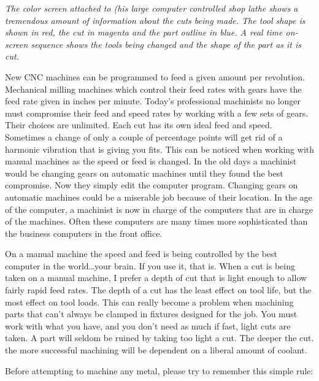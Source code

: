 \bigskip
\textit{The color screen attached to (his large computer controlled shop lathe
shows a tremendous amount of information about the cuts being made. The tool
shape is shown in red, the cut in magenta and the part outline in blue. A real
time on-screen sequence shows the tools being changed and the shape of the part
as it is cut.}
\bigskip


New CNC machines can be programmed to feed a given amount per revolution.
Mechanical milling machines which control their feed rates with gears have the
feed rate given in inches per minute. Today's professional machinists no longer
must compromise their feed and speed rates by working with a few sets of gears.
Their choices are unlimited. Each cut has its own ideal feed and speed.
Sometimes a change of only a couple of percentage points will get rid of a
harmonic vibration that is giving you fits. This can be noticed when working
with manual machines as the speed or feed is changed. In the old days a
machinist would be changing gears on automatic machines until they found the
best compromise. Now they simply edit the computer program. Changing gears on
automatic machines could be a miserable job because of their location. In the
age of the computer, a machinist is now in charge of the computers that are in
charge of the machines. Often these computers are many times more sophisticated
than the business computers in the front office.


On a manual machine the speed and feed is being controlled by the best computer
in the world\ldots your brain. If you use it, that is. When a cut is being taken
on a manual machine, I prefer a depth of cut that is light enough to allow
fairly rapid feed rates. The depth of a cut has the least effect on tool life,
but the most effect on tool loads. This can really become a problem when
machining parts that can't always be clamped in fixtures designed for the job.
You must work with what you have, and you don't need as much if fast, light cuts
are taken. A part will seldom be ruined by taking too light a cut. The deeper
the cut. the more successful machining will be dependent on a liberal amount of
coolant.


Before attempting to machine any metal, please try to remember this simple rule:

